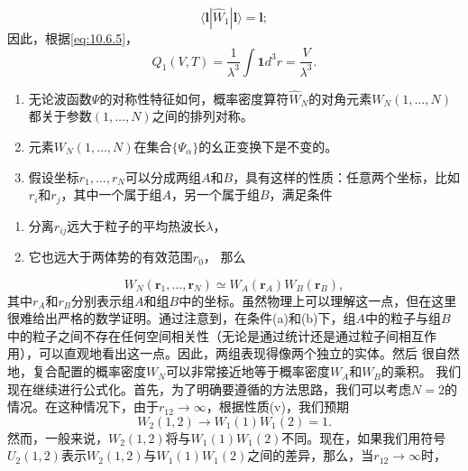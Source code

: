 \begin{equation}\tag{10.6.7}\label{eq:10.6.7}
\langle \mathbf { l } | \hat { W } _ { 1 } | \mathbf { l } \rangle = \mathbf { l } ;
\end{equation}
因此，根据\autoref{eq:10.6.5}，
\begin{equation}\tag{10.6.8}\label{eq:10.6.8}
Q _ { 1 } ( V , T ) = \frac { 1 } { \lambda ^{3} } \int \mathbf { 1 } d ^{3} r = \frac { V } { \lambda ^{3} } .
\end{equation}
\begin{enumerate}
\def\labelenumi{(\roman{enumi})}
\setcounter{enumi}{2}
\item
  无论波函数\(\Psi\)的对称性特征如何，概率密度算符\(\hat{W}_{N}\)的对角元素\(W_{N}(1,\ldots,N)\)都关于参数\((1,\ldots,N)\)之间的排列对称。
\item
  元素\(W_{N}(1,\ldots,N)\)在集合\(\{\Psi_{\alpha}\}\)的幺正变换下是不变的。
\item
  假设坐标\(r_{1},\ldots,r_{N}\)可以分成两组\(A\)和\(B\)，具有这样的性质：任意两个坐标，比如\(r_{i}\)和\(r_{j}\)，其中一个属于组\(A\)，另一个属于组\(B\)，满足条件
\end{enumerate}
\begin{enumerate}
\def\labelenumi{(\alph{enumi})}
\item
  分离\(r_{ij}\)远大于粒子的平均热波长\(\lambda\)，
\item
  它也远大于两体势的有效范围\(r_{0}\)， 那么
\end{enumerate}
\begin{equation}\tag{10.6.9}\label{eq:10.6.9}
W _ { N } ( \pmb { r } _ { 1 } , \ldots , \pmb { r } _ { N } ) \simeq W _ { A } ( \pmb { r } _ { A } ) W _ { B } ( \pmb { r } _ { B } ) ,
\end{equation}
其中\(r_{A}\)和\(r_{B}\)分别表示组\(A\)和组\(B\)中的坐标。虽然物理上可以理解这一点，但在这里很难给出严格的数学证明。通过注意到，在条件(a)和(b)下，组\(A\)中的粒子与组\(B\)中的粒子之间不存在任何空间相关性（无论是通过统计还是通过粒子间相互作用），可以直观地看出这一点。因此，两组表现得像两个独立的实体。然后
很自然地，复合配置的概率密度\(W_{N}\)可以非常接近地等于概率密度\(W_{A}\)和\(W_{B}\)的乘积。
我们现在继续进行公式化。首先，为了明确要遵循的方法思路，我们可以考虑\(N=2\)的情况。在这种情况下，由于\(r_{12} \rightarrow \infty\)，根据性质(v)，我们预期
\begin{equation}\tag{10.6.10}\label{eq:10.6.10}
W _ { 2 } ( 1 , 2 ) \rightarrow W _ { 1 } ( 1 ) W _ { 1 } ( 2 ) = 1 .
\end{equation}
然而，一般来说，\(W_{2}(1,2)\)将与\(W_{1}(1)W_{1}(2)\)不同。现在，如果我们用符号\(U_{2}(1,2)\)表示\(W_{2}(1,2)\)与\(W_{1}(1)W_{1}(2)\)之间的差异，那么，当\(r_{12} \rightarrow \infty\)时，
